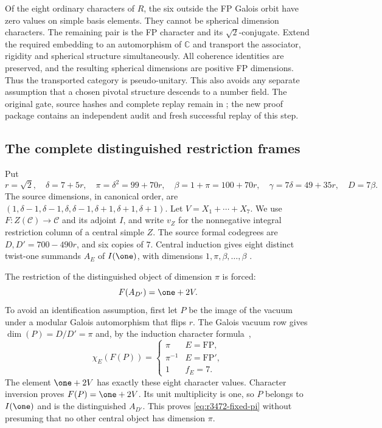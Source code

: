 Of the eight ordinary characters of $R$, the six outside the FP Galois
orbit have zero values on simple basis elements. They cannot be spherical
dimension characters. The remaining pair is the FP character and its
$\sqrt2$-conjugate. Extend the required embedding to an automorphism of
$\mathbb C$ and transport the associator, rigidity and spherical structure
simultaneously. All coherence identities are preserved, and the resulting
spherical dimensions are positive FP dimensions. Thus the transported
category is pseudo-unitary. This also avoids any separate assumption that
a chosen pivotal structure descends to a number field.
The original gate, source hashes and complete replay remain in
; the new proof package
contains an independent audit and fresh successful replay of this step.

\subsection{The complete distinguished restriction frames}
Put
\[
 r=\sqrt2,\quad \delta=7+5r,\quad
 \pi=\delta^2=99+70r,\quad \beta=1+\pi=100+70r,
 \quad \gamma=7\delta=49+35r,\quad D=7\beta.
\]
The source dimensions, in canonical order, are
$(1,\delta-1,\delta-1,\delta,\delta-1,\delta+1,\delta+1,\delta+1)$.
Let $V=X_1+\cdots+X_7$. We use $F:Z(\mathcal C)\to\mathcal C$ and
its adjoint $I$, and write $v_Z$ for the nonnegative integral restriction
column of a central simple $Z$.
The source formal codegrees are $D,D'=700-490r$, and six copies of $7$.
Central induction gives eight distinct twist-one summands $A_E$ of
$I(\one)$, with dimensions $1,\pi,\beta,\ldots,\beta$
\cite[Theorem~2.13]{OstrikPiv3}.

The restriction of the distinguished object of dimension $\pi$ is forced:
\begin{equation}\label{eq:r3472-fixed-pi}
 F(A_{D'})=\one+2V.
\end{equation}
To avoid an identification assumption, first let $P$ be the image of the
vacuum under a modular Galois automorphism that flips $r$. The Galois
vacuum row gives $\dim(P)=D/D'=\pi$ and, by the induction character
formula~\cite[Lemma~4.3 and Corollary~4.5]{DeshpandeCenter},
\[
 \chi_E(F(P))=\begin{cases}
 \pi&E=\mathrm{FP},\\
 \pi^{-1}&E=\mathrm{FP}',\\
 1&f_E=7.
 \end{cases}
\]
The element $\one+2V$ has exactly these eight character values.
Character inversion proves $F(P)=\one+2V$. Its unit multiplicity is one,
so $P$ belongs to $I(\one)$ and is the distinguished $A_{D'}$.
This proves \eqref{eq:r3472-fixed-pi} without presuming that no other
central object has dimension $\pi$.

